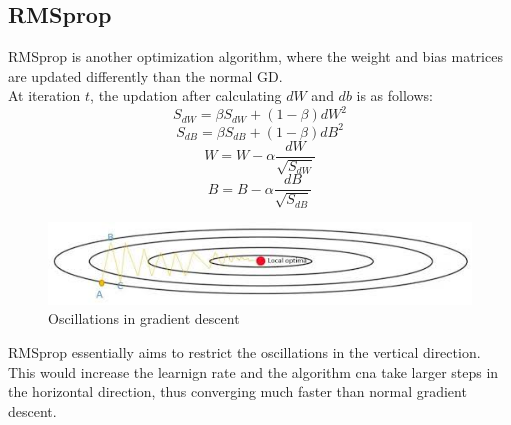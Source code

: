 \documentclass[12pt]{article}
\begin{document}
\subsection{RMSprop}
RMSprop is another optimization algorithm, where the weight and bias matrices are updated differently than the normal GD.\\
At iteration $t$, the updation after calculating $dW$ and $db$ is as follows:
\begin{equation}
    S_{dW} = \beta S_{dW} + (1-\beta) dW^2
\end{equation}
\begin{equation}
    S_{dB} = \beta S_{dB} + (1-\beta) dB^2
\end{equation}
\begin{equation}
    W = W - \alpha \frac{dW}{\sqrt{S_{dW}}}
\end{equation}
\begin{equation}
    B = B - \alpha \frac{dB}{\sqrt{S_{dB}}}
\end{equation}
\newpage
\begin{figure}[h]
    \centering
    \includegraphics[width=15cm]{rmsprop.jpeg}
    \caption{Oscillations in gradient descent}
\end{figure}
RMSprop essentially aims to restrict the oscillations in the vertical direction. This would increase the learnign rate and the algorithm cna take larger steps in the horizontal direction, thus converging much faster than normal gradient descent.\\



\newpage
\end{document}
